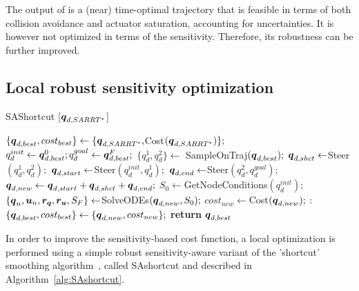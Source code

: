 The output of  is a (near) time-optimal trajectory that is feasible in terms of both collision avoidance and actuator saturation, accounting for uncertainties.
It is however not optimized in terms of the sensitivity. 
Therefore, its robustness can be further improved.

\subsection{Local robust sensitivity optimization}

\begin{algorithm}[htp]
    \caption{SAShortcut [$\boldsymbol{q}_{d,SARRT^*}$]}\label{alg:SAshortcut}
    \begin{algorithmic}[1]
        \State $\{\boldsymbol{q}_{d,best}, cost_{best}\} \gets \{\boldsymbol{q}_{d,SARRT^*}, $Cost$(\boldsymbol{q}_{d,SARRT^*}) \};$
        \State $q_d^{init} \gets \boldsymbol{q}_{d,best}^0; q_d^{goal} \gets \boldsymbol{q}_{d,best}^F;$
            \State $\{q_d^{1}, q_d^{2}\} \gets$ SampleOnTraj$(\boldsymbol{q}_{d,best});$
            \State $\boldsymbol{q}_{d,shct} \gets $Steer$(q_d^{1}, q_d^{2});$
                \State $\boldsymbol{q}_{d,start} \gets $Steer$(q_d^{init}, q_d^{1});$
                \State $\boldsymbol{q}_{d,end} \gets $Steer$(q_d^{2}, q_d^{goal});$
                \State $\boldsymbol{q}_{d,new} \gets \boldsymbol{q}_{d,start}+\boldsymbol{q}_{d,shct}+\boldsymbol{q}_{d,end};$
                \State $S_0 \gets $GetNodeConditions$(q_d^{init});$
                \State $\{\boldsymbol{q}_n, \boldsymbol{u}_n, \boldsymbol{r_q}, \boldsymbol{r_u}, S_F\}  \gets $SolveODEs$(\boldsymbol{q}_{d,new}, S_0);$
                \State $cost_{new} \gets $Cost$(\boldsymbol{q}_{d,new});$
                :   
                        \State $\{\boldsymbol{q}_{d,best}, cost_{best}\} \gets \{\boldsymbol{q}_{d,new}, cost_{new}\};$
                    \EndIf
                \EndIf
            \EndIf
        \EndWhile
    \State \textbf{return} $\boldsymbol{q}_{d,best}$
    \end{algorithmic}
\end{algorithm}

In order to improve the sensitivity-based cost function, a local optimization is performed using a simple robust sensitivity-aware variant of the 'shortcut' smoothing algorithm~\cite{cShortcut}, called \gls{SAshortcut} and described in Algorithm~\ref{alg:SAshortcut}. 

